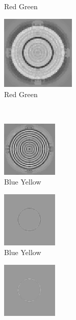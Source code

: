 \documentclass[journal,onecolumn]{IEEEtran}
\begin{document}
{\begin{figure}[H]
\begin{subfigure}[b]{0.25\textwidth}
            \caption{Red Green}
            \label{fig:test-circle-neon-dwt-b-rg-mask}
    \end{subfigure}%
    \begin{subfigure}[b]{0.25\textwidth}
            \centering
            \includegraphics[width=100pt, frame]{test-circle-neon-dwt-b-rg}
            \caption{Red Green}
            \label{fig:test-circle-neon-dwt-b-rg}
    \end{subfigure}\\
    \begin{subfigure}[b]{0.25\textwidth}
            \centering
            \includegraphics[width=100px, frame]{test-circle-neon-dwt-a-by}
            \caption{Blue Yellow}
            \label{fig:test-circle-neon-dwt-a-by}
    \end{subfigure}%
    \begin{subfigure}[b]{0.25\textwidth}
            \centering
            \includegraphics[width=100px, frame]{test-circle-neon-dwt-a-by-mask}
            \caption{Blue Yellow}
            \label{fig:test-circle-neon-dwt-a-by-mask}
    \end{subfigure}%
    \begin{subfigure}[b]{0.25\textwidth}
            \centering
            \includegraphics[width=100px, frame]{test-circle-neon-dwt-b-by-mask}

\end{subfigure}
\end{figure}}
\end{document}

